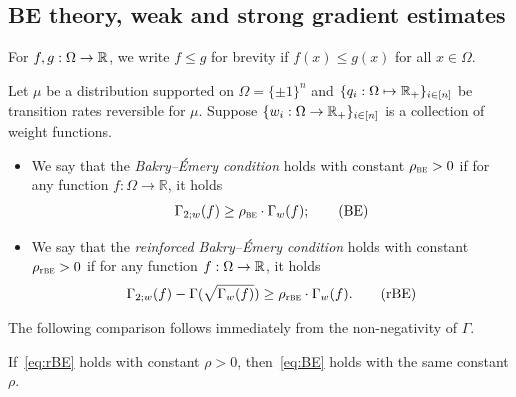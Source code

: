 \subsection{BE theory, weak and strong gradient estimates}
For $f,g: \Omega \to \mathbb{R}$, we write $f\leq g$ for brevity if $f(x)\leq g(x)$ for all $x\in \Omega$.
\begin{definition}
    Let $\mu$ be a distribution supported on $\Omega = \{\pm 1\}^n$ and $\{q_i: \Omega \mapsto \mathbb{R}_+\}_{i\in[n]}$ be transition rates reversible for $\mu$.
    Suppose $\{w_i:\Omega \to \mathbb{R}_+\}_{i\in[n]}$ is a collection of weight functions.
    \begin{itemize}
        \item We say that the \textit{Bakry--\'Emery condition} holds with constant $\rho_{{\normalfont\textsc{be}}} > 0$ if for any function $f: \Omega \to \mathbb{R}$, it holds
        \begin{align}\label{eq:BE}
            \Gamma_{2;w}(f) \geq \rho_{{\normalfont\textsc{be}}} \cdot \Gamma_w(f); \tag{BE}
        \end{align}
        \item We say that the \textit{reinforced Bakry--\'Emery condition} holds with constant $\rho_{\mathrm{r}{\normalfont\textsc{be}}} > 0$ if for any function $f: \Omega \to \mathbb{R}$, it holds 
        \begin{align}\label{eq:rBE}
            \Gamma_{2;w}(f) - \Gamma(\sqrt{\Gamma_w(f)}) \ge \rho_{\mathrm{r}{\normalfont\textsc{be}}} \cdot \Gamma_w(f). \tag{rBE}
        \end{align}
    \end{itemize}
\end{definition}

The following comparison follows immediately from the non-negativity of $\Gamma$.
\begin{fact}
If~\ref{eq:rBE} holds with constant $\rho > 0$, then~\ref{eq:BE} holds with the same constant $\rho$.
\end{fact}




